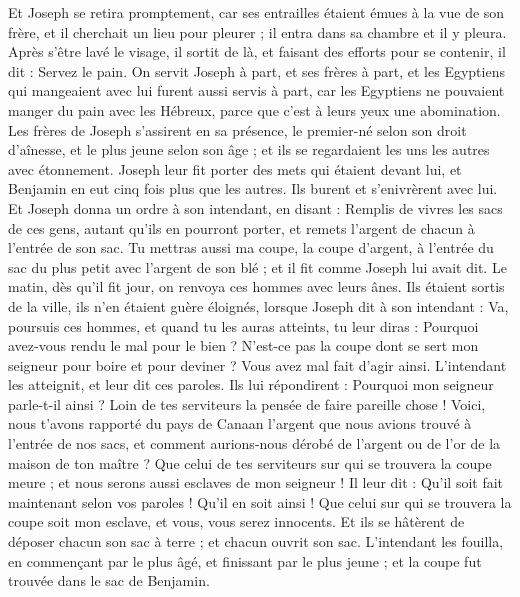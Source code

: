 \begin{multicols}{2}
Et Joseph se retira promptement, car ses entrailles étaient émues à la vue de son frère, et il cherchait un lieu pour pleurer ; il entra dans sa chambre et il y pleura.
Après s'être lavé le visage, il sortit de là, et faisant des efforts pour se contenir, il dit : Servez le pain.
On servit Joseph à part, et ses frères à part, et les Egyptiens qui mangeaient avec lui furent aussi servis à part, car les Egyptiens ne pouvaient manger du pain avec les Hébreux, parce que c'est à leurs yeux une abomination.
Les frères de Joseph s'assirent en sa présence, le premier-né selon son droit d'aînesse, et le plus jeune selon son âge ; et ils se regardaient les uns les autres avec étonnement.
Joseph leur fit porter des mets qui étaient devant lui, et Benjamin en eut cinq fois plus que les autres. Ils burent et s'enivrèrent avec lui.
\VerseOne{}Et Joseph donna un ordre à son intendant, en disant : Remplis de vivres les sacs de ces gens, autant qu'ils en pourront porter, et remets l'argent de chacun à l'entrée de son sac.
Tu mettras aussi ma coupe, la coupe d'argent, à l'entrée du sac du plus petit avec l'argent de son blé ; et il fit comme Joseph lui avait dit.
Le matin, dès qu'il fit jour, on renvoya ces hommes avec leurs ânes.
Ils étaient sortis de la ville, ils n'en étaient guère éloignés, lorsque Joseph dit à son intendant : Va, poursuis ces hommes, et quand tu les auras atteints, tu leur diras : Pourquoi avez-vous rendu le mal pour le bien ?
N'est-ce pas la coupe dont se sert mon seigneur pour boire et pour deviner ? Vous avez mal fait d'agir ainsi.
L'intendant les atteignit, et leur dit ces paroles.
Ils lui répondirent : Pourquoi mon seigneur parle-t-il ainsi ? Loin de tes serviteurs la pensée de faire pareille chose !
Voici, nous t'avons rapporté du pays de Canaan l'argent que nous avions trouvé à l'entrée de nos sacs, et comment aurions-nous dérobé de l'argent ou de l'or de la maison de ton maître ?
Que celui de tes serviteurs sur qui se trouvera la coupe meure ; et nous serons aussi esclaves de mon seigneur !
Il leur dit : Qu'il soit fait maintenant selon vos paroles ! Qu'il en soit ainsi ! Que celui sur qui se trouvera la coupe soit mon esclave, et vous, vous serez innocents.
Et ils se hâtèrent de déposer chacun son sac à terre ; et chacun ouvrit son sac.
L'intendant les fouilla, en commençant par le plus âgé, et finissant par le plus jeune ; et la coupe fut trouvée dans le sac de Benjamin.

\end{multicols}
